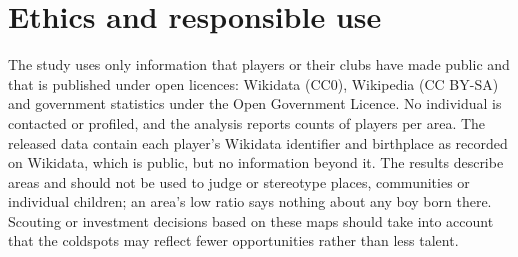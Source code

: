 \section{Ethics and responsible use}
\label{sec:ethics}

The study uses only information that players or their clubs have made public and that is published under open licences: Wikidata (CC0), Wikipedia (CC BY-SA) and government statistics under the Open Government Licence. No individual is contacted or profiled, and the analysis reports counts of players per area. The released data contain each player's Wikidata identifier and birthplace as recorded on Wikidata, which is public, but no information beyond it. The results describe areas and should not be used to judge or stereotype places, communities or individual children; an area's low ratio says nothing about any boy born there. Scouting or investment decisions based on these maps should take into account that the coldspots may reflect fewer opportunities rather than less talent.
